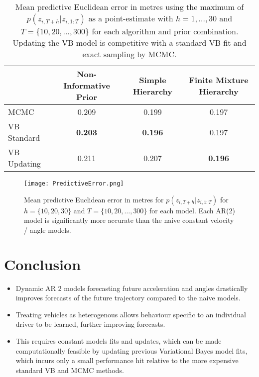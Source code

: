 \documentclass[12pt,a4paper]{article}\usepackage[]{graphicx}\usepackage[]{color}
\begin{document}
\begin{center}
\begin{table}[h]
\begin{tabular}{| l | c | c | c |}
\hline
& Non-Informative Prior & Simple Hierarchy & Finite Mixture Hierarchy \\
\hline
MCMC & 0.209 & 0.199 & 0.197 \\
VB Standard & \textbf{0.203} & \textbf{0.196} & 0.197 \\
VB Updating & 0.211 & 0.207 & \textbf{0.196} \\
\hline
\end{tabular}
\label{tableError}
\caption{Mean predictive Euclidean error in metres using the maximum of $p(z_{i, T+h} | z_{i, 1:T})$ as a point-estimate with $h = 1, \dots, 30$ and $T = \{10, 20, \dots, 300\}$ for each algorithm and prior combination. Updating the VB model is competitive with a standard VB fit and exact sampling by MCMC.}
\end{table}
\end{center}

\begin{figure}[t]
\centering
\texttt{[image: PredictiveError.png]}
\caption{Mean predictive Euclidean error in metres for $p(z_{i, T+h} | z_{i, 1:T})$ for $h = \{10, 20, 30\}$ and $T = \{10, 20, \dots, 300\}$ for each model. Each AR(2) model is significantly more accurate than the naive constant velocity / angle models.}
\label{fig:PredError}
\end{figure}

\section{Conclusion}
\begin{itemize}
\item Dynamic AR 2 models forecasting future acceleration and angles drastically improves forecasts of the future trajectory compared to the naive models.
\item Treating vehicles as heterogenous allows behaviour specific to an individual driver to be learned, further improving forecasts.
\item This requires constant models fits and updates, which can be made computationally feasible by updating previous Variational Bayes model fits, which incurs only a small performance hit relative to the more expensive standard VB and MCMC methods.
\end{itemize}
\end{document}
